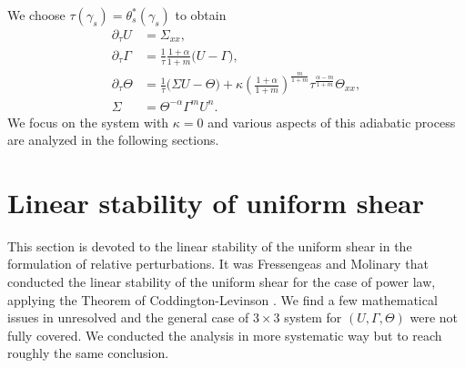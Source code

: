 \documentclass[a4paper,11pt]{article}
\theoremstyle{remark}
\begin{document}
We choose $\tau(\gamma_s) = \theta_s^*(\gamma_s)$ to obtain
\begin{equation} 
 \begin{aligned}
  \partial_\tau U &= \Sigma_{xx},\\
  \partial_\tau \Gamma &= \frac{1}{\tau}\frac{1+\alpha}{1+m} \Big(U-\Gamma\Big),\\
  \partial_\tau \Theta &= \frac{1}{\tau}\Big(\Sigma U - \Theta\Big) + \kappa\left(\frac{1+\alpha}{1+m}\right)^{\frac{m}{1+m}}\tau^{\frac{\alpha-m}{1+m}}\Theta_{xx}, \\
  \Sigma&=\Theta^{-\alpha}\Gamma^m U^n.
 \end{aligned}
\end{equation}
We focus on the system with $\kappa=0$ and various aspects of this adiabatic process are  analyzed in the following sections. %


\section{Linear stability of uniform shear}

This section is devoted to the linear stability of the uniform shear in the formulation of relative perturbations. It was Fressengeas and Molinary \cite{FM} that conducted the linear stability of the uniform shear for the case of power law, applying the Theorem of Coddington-Levinson \cite{CL1955}. We find a few mathematical issues in \cite{FM} unresolved and the general case of $3\times3$ system for $(U,\Gamma,\Theta)$ were not fully covered. We conducted the analysis in more systematic way but to reach roughly the same conclusion.
\end{document}
